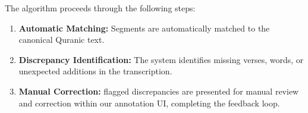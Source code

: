The algorithm proceeds through the following steps:
\begin{enumerate}
\item \textbf{Automatic Matching:} Segments are automatically matched to the canonical Quranic text.
\item \textbf{Discrepancy Identification:} The system identifies missing verses, words, or unexpected additions in the transcription.
\item \textbf{Manual Correction:} flagged discrepancies are presented for manual review and correction within our annotation UI, completing the  feedback loop.
\end{enumerate}
















